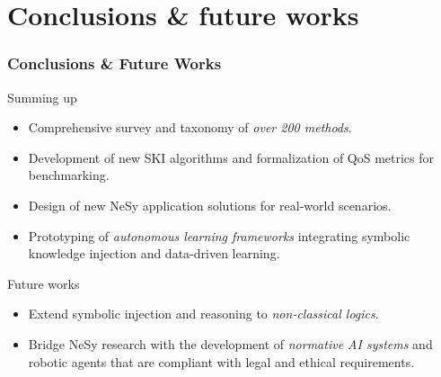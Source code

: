 \documentclass[presentation]{beamer}\mode<presentation>{\usetheme{AMSBolognaFC}}
\begin{document}
\section{Conclusions \& future works}
\label{sec:conclusions-&-future-works}

\begin{frame}
\frametitle{Conclusions \& Future Works}

\begin{block}{Summing up}
    \begin{itemize}
        \item Comprehensive survey and taxonomy of \emph{over 200 methods}.
        \item Development of new SKI algorithms and formalization of QoS metrics for benchmarking.
        \item Design of new NeSy application solutions for real-world scenarios.
        \item Prototyping of \emph{autonomous learning frameworks} integrating symbolic knowledge injection and data-driven learning.
    \end{itemize}
\end{block}

\begin{exampleblock}{Future works}
    \begin{itemize}
        \item Extend symbolic injection and reasoning to \emph{non-classical logics}.
        \item Bridge NeSy research with the development of \emph{normative AI systems} and robotic agents that are compliant with legal and ethical requirements.
    \end{itemize}
\end{exampleblock}

\end{frame}
\end{document}
